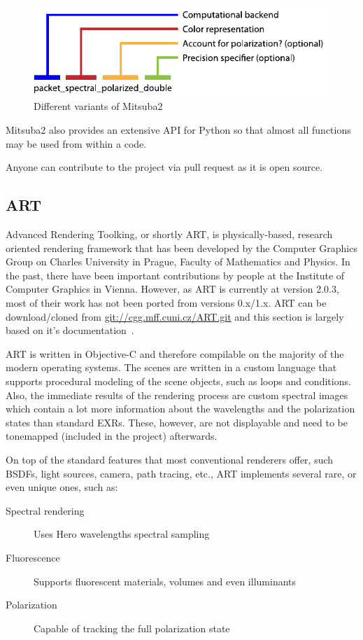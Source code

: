 \begin{figure}
	\centering
	\includegraphics[width=0.8\linewidth]{img/mitsuba_variants.pdf}
	\caption{Different variants of Mitsuba2}
	\label{fig:mitsuba_variations}
\end{figure}

Mitsuba2 also provides an extensive API for Python so that almost all functions may be used from within a code. 

Anyone can contribute to the project via pull request as it is open source.

\subsection{ART}

Advanced Rendering Toolking, or shortly ART, is physically-based, research oriented rendering framework that has been developed by the Computer Graphics Group on Charles University in Prague, Faculty of Mathematics and Physics. In the past, there have been important contributions by people at the Institute of Computer Graphics in Vienna. However, as ART is currently at version 2.0.3, most of their work has not been ported from versions 0.x/1.x. ART can be download/cloned from \url{git://cgg.mff.cuni.cz/ART.git} and this section is largely based on it's documentation~\cite{artDoc}.

ART is written in Objective-C and therefore compilable on the majority of the modern operating systems. The scenes are written in a custom language that supports procedural modeling of the scene objects, such as loops and conditions. Also, the immediate results of the rendering process are custom spectral images which contain a lot more information about the wavelengths and the polarization states than standard EXRs. These, however, are not displayable and need to be tonemapped (included in the project) afterwards.

On top of the standard features that most conventional renderers offer, such BSDFs, light sources, camera, path tracing, etc., ART implements several rare, or even unique ones, such as:

\begin{description}
	\item[Spectral rendering] Uses Hero wavelengths spectral sampling
	\item[Fluorescence] Supports fluorescent materials, volumes and even illuminants
	\item[Polarization] Capable of tracking the full polarization state
\end{description}

